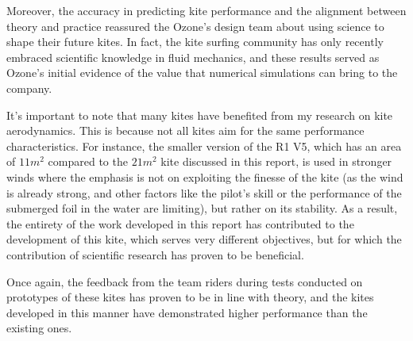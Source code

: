 Moreover, the accuracy in predicting kite performance and the alignment between theory and practice reassured the Ozone's design team about using science to shape their future kites. In fact, the kite surfing community has only recently embraced scientific knowledge in fluid mechanics, and these results served as Ozone's initial evidence of the value that numerical simulations can bring to the company.

It's important to note that many kites have benefited from my research on kite aerodynamics. This is because not all kites aim for the same performance characteristics. For instance, the smaller version of the R1 V5, which has an area of $11m^{2}$ compared to the $21m^{2}$ kite discussed in this report, is used in stronger winds where the emphasis is not on exploiting the finesse of the kite (as the wind is already strong, and other factors like the pilot's skill or the performance of the submerged foil in the water are limiting), but rather on its stability. As a result, the entirety of the work developed in this report has contributed to the development of this kite, which serves very different objectives, but for which the contribution of scientific research has proven to be beneficial. 

Once again, the feedback from the team riders during tests conducted on prototypes of these kites has proven to be in line with theory, and the kites developed in this manner have demonstrated higher performance than the existing ones.
